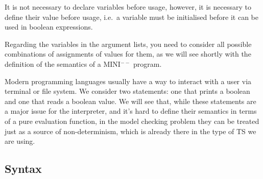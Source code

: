 \documentclass{article}
\begin{document}
It is not necessary to declare variables before usage, however, it is necessary to define their value before usage, i.e.~a variable must be initialised before it can be used in boolean expressions.

Regarding the variables in the argument lists, you need to consider all possible combinations of assignments of values for them, as we will see shortly with the definition of the semantics of a MINI$^{--}$ program.

Modern programming languages usually have a way to interact with a user via terminal or file system. We consider two statements: one that prints a boolean and one that reads a boolean value.
We will see that, while these statements are a major issue for the interpreter, and it's hard to define their semantics in terms of a pure evaluation function, in the model checking problem they can be treated just as a source of non-determinism, which is already there in the type of TS we are using.

\subsection{Syntax}
\end{document}
